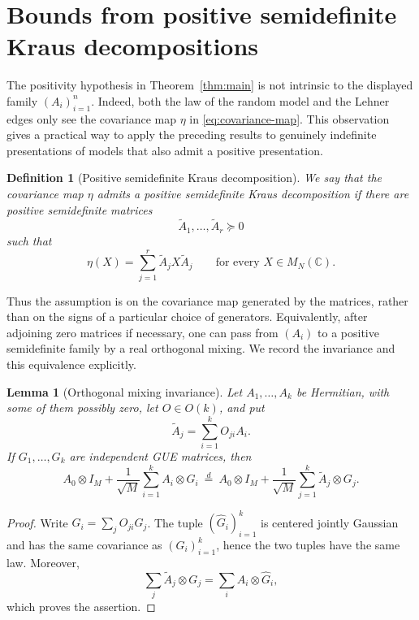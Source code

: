 \documentclass{article}
\newtheorem{lemma}[theorem]{Lemma}
\newtheorem{definition}[theorem]{Definition}
\newcommand{\C}{\mathbb C}
\begin{document}
\section{Bounds from positive semidefinite Kraus decompositions}
\label{sec:rekraus}

The positivity hypothesis in Theorem~\ref{thm:main} is not intrinsic to the
displayed family $(A_i)_{i=1}^n$.  Indeed, both the law of the random model and
the Lehner edges only see the covariance map \(\eta\) in
\eqref{eq:covariance-map}.  This observation gives a practical way to apply the
preceding results to genuinely indefinite presentations of models that also
admit a positive presentation.

\begin{definition}[Positive semidefinite Kraus decomposition]
	\label{def:psd-rekraus}
	We say that the covariance map \(\eta\) \emph{admits a positive
		semidefinite Kraus decomposition} if there are positive semidefinite matrices
	\[
		\widetilde A_1,\ldots,\widetilde A_r\succeq0
	\]
	such that
	\begin{equation}
		\label{eq:psd-rekraus}
		\eta(X)=\sum_{j=1}^r\widetilde A_jX\widetilde A_j
		\qquad\text{for every }X\in M_N(\C).
	\end{equation}
\end{definition}

Thus the assumption is on the covariance map generated by the matrices, rather
than on the signs of a particular choice of generators.  Equivalently, after
adjoining zero matrices if necessary, one can pass from $(A_i)$ to a positive
semidefinite family by a real orthogonal mixing.  We record the invariance and
this equivalence explicitly.

\begin{lemma}[Orthogonal mixing invariance]
	\label{lem:orthogonal-mixing}
	Let $A_1,\ldots,A_k$ be Hermitian, with some of them possibly zero, let
	$O\in O(k)$, and put
	\[
		\widetilde A_j=\sum_{i=1}^k O_{ji}A_i.
	\]
	If $G_1,\ldots,G_k$ are independent GUE matrices, then
	\[
		A_0\otimes I_M+\frac1{\sqrt M}\sum_{i=1}^k A_i\otimes G_i
		\ \stackrel{d}{=}\
		A_0\otimes I_M+\frac1{\sqrt M}\sum_{j=1}^k
		\widetilde A_j\otimes G_j.
	\]
\end{lemma}

\begin{proof}
	Write $\widehat G_i=\sum_jO_{ji}G_j$.  The tuple
	$(\widehat G_i)_{i=1}^k$ is centered jointly Gaussian and has the same
	covariance as $(G_i)_{i=1}^k$, hence the two tuples have the same law.
	Moreover,
	\[
		\sum_j\widetilde A_j\otimes G_j
		=\sum_iA_i\otimes\widehat G_i,
	\]
	which proves the assertion.
\end{proof}
\end{document}
